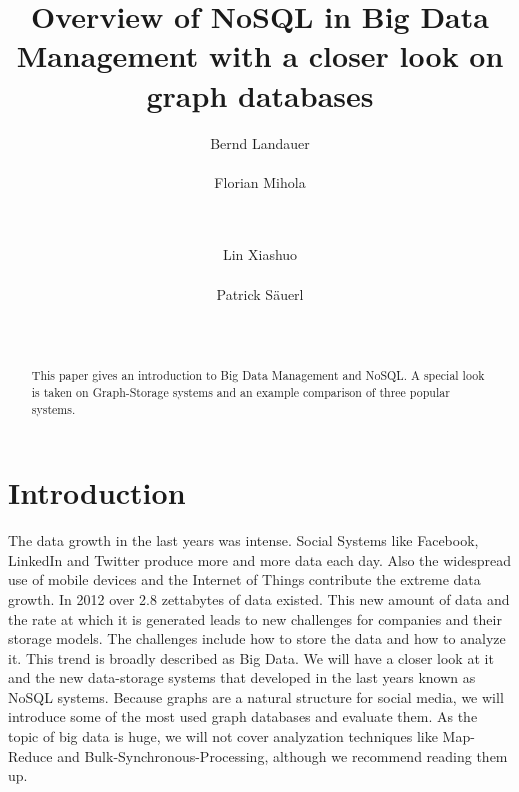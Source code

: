 \documentclass{acm_proc_article-sp}
\begin{document}
\title{Overview of NoSQL in Big Data Management with a closer look on graph databases }

\author{
\alignauthor
Bernd Landauer\\
       \\
\alignauthor 
Florian Mihola\\
	\\
	\\
\and
\alignauthor Lin Xiashuo \\
       \\
\alignauthor Patrick S{\"a}uerl\\
       \\
       \\
}


\maketitle
\begin{abstract}
This paper gives an introduction to Big Data Management and NoSQL. A special look is taken on Graph-Storage systems and an example comparison of three popular systems.
\end{abstract}

\section{Introduction}

The data growth in the last years was intense. Social Systems like Facebook, LinkedIn and Twitter produce more and more data each day. Also the widespread use of mobile devices and the Internet of Things contribute the extreme data growth. In 2012 over 2.8 zettabytes of data existed\cite{DBLP:conf/bis/SchmidtMMPH14}. This new amount of data and the rate at which it is generated leads to new challenges for companies and their storage models. The challenges include how to store the data and how to analyze it. This trend is broadly described as Big Data. We will have a closer look at it and the new data-storage systems that developed in the last years known as NoSQL systems. Because graphs are a natural structure for social media, we will introduce some of the most used graph databases and evaluate them. As the topic of big data is huge, we will not cover analyzation techniques like Map-Reduce and Bulk-Synchronous-Processing, although we recommend reading them up.
\end{document}
